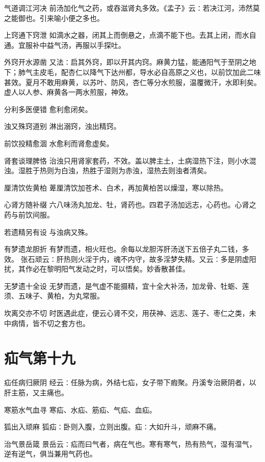 \documentclass[a4paper,12pt,UTF8,twoside]{ctexbook}
\begin{document}
    气道调江河决
    前汤加化气之药，或吞滋肾丸多效。《孟子》云∶若决江河，沛然莫之能御也。引来喻小便之多也。
    
    上窍通下窍泄
    如滴水之器，闭其上而倒悬之，点滴不能下也。去其上闭，而水自通。宜服补中益气汤，再服以手探吐。
    
    外窍开水源凿
    又法∶启其外窍，即以开其内窍。麻黄力猛，能通阳气于至阴之地下；肺气主皮毛，配杏仁以降气下达州都，导水必自高原之义也，以前饮加此二味甚效。夏月不敢用麻黄，以苏叶、防风，杏仁等分水煎服，温覆微汗，水即利矣。虚人以人参、麻黄各一两水煎服，神效。
    
    分利多医便错
    愈利愈闭矣。
    
    浊又殊窍道别
    淋出溺窍，浊出精窍。
    
    前饮投精愈涸
    水愈利而肾愈虚矣。
    
    肾套谈理脾恪
    治浊只用肾家套药，不效。盖以脾主土，土病湿热下注，则小水混浊。湿胜于热则为白浊，热胜于湿则为赤浊，湿热去则浊者清矣。
    
    厘清饮佐黄柏
    萆厘清饮加苍术、白术，再加黄柏苦以燥湿，寒以除热。
    
    心肾方随补缀
    六八味汤丸加龙、牡，肾药也。四君子汤加远志，心药也。心肾之药与前饮间服。
    
    若遗精另有设
    与浊病又殊。
    
    有梦遗龙胆折
    有梦而遗，相火旺也。余每以龙胆泻肝汤送下五倍子丸二钱，多效。
    张石顽云∶肝热则火淫于内，魂不内守，故多淫梦失精。又云∶多是阴虚阳扰，其作必在黎明阳气发动之时，可以悟矣。妙香散甚佳。
    
    无梦遗十全设
    无梦而遗，是气虚不能摄精，宜十全大补汤，加龙骨、牡蛎、莲须、五味子、黄柏，为丸常服。
    
    坎离交亦不切
    时医遇此症，便云心肾不交，用茯神、远志、莲子、枣仁之类，未中病情，皆不切之套方也。
    
    \chapter{疝气第十九}
      疝任病归厥阴
    经云∶任脉为病，外结七疝，女子带下瘕聚。丹溪专治厥阴者，以肝主筋，又主痛也。
    
    寒筋水气血寻
    寒疝、水疝、筋疝、气疝、血疝。
    
    狐出入顽麻
    狐疝∶卧则入腹，立则出腹。疝∶大如升斗，顽麻不痛。
    
    治气景岳箴
    景岳云∶疝而曰气者，病在气也。寒有寒气，热有热气，湿有湿气，逆有逆气，俱当兼用气药也。
    
\end{document}
